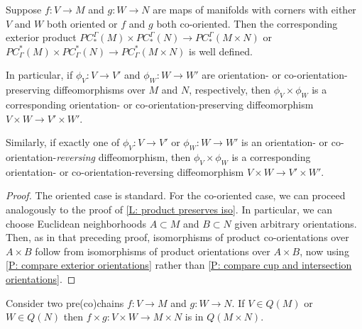 \begin{lemma}\label{L: ext product preserves iso}
	Suppose $f \colon V \to M$ and $g \colon W \to N$ are maps of manifolds with corners with either $V$ and $W$ both oriented or $f$ and $g$ both co-oriented.
	Then the corresponding exterior product $PC_*^\Gamma(M) \times PC_*^\Gamma(N) \to PC_*^\Gamma(M \times N)$ or $PC^*_\Gamma(M) \times PC^*_\Gamma(N) \to PC^*_\Gamma(M \times N)$ is well defined.

	In particular, if $\phi_V \colon V \to V'$ and $\phi_W \colon W \to W'$ are orientation- or co-orientation-preserving diffeomorphisms over $M$ and $N$, respectively, then $\phi_V \times \phi_W$ is a corresponding orientation- or co-orientation-preserving diffeomorphism $V \times W \to V' \times W'$.

	Similarly, if exactly one of $\phi_V \colon V \to V'$ or $\phi_W \colon W \to W'$ is an orientation- or co-orientation-\textit{reversing} diffeomorphism, then $\phi_V \times \phi_W$ is a corresponding orientation- or co-orientation-reversing diffeomorphism $V \times W \to V' \times W'$.
\end{lemma}
\begin{proof}
	The oriented case is standard.
	For the co-oriented case, we can proceed analogously to the proof of \cref{L: product preserves iso}.
	In particular, we can choose Euclidean neighborhoods $A \subset M$ and $B \subset N$ given arbitrary orientations.
	Then, as in that preceding proof, isomorphisms of product co-orientations over $A \times B$ follow from isomorphisms of product orientations over $A \times B$, now using \cref{P: compare exterior orientations} rather than \cref{P: compare cup and intersection orientations}.
\end{proof}


\begin{lemma}\label{L: exterior Q}
	Consider two pre(co)chains $f \colon V \to M$ and $g \colon W \to N$.
	If $V \in Q(M)$ or $W \in Q(N)$ then $f \times g \colon V \times W \to M \times N$ is in $Q(M \times N)$.
\end{lemma}


